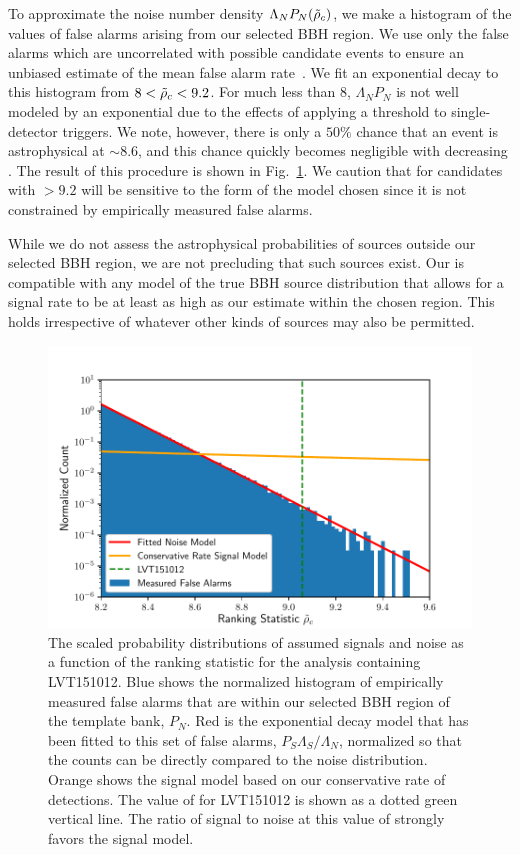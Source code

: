 To approximate the noise number density $\Lambda_N P_N(\tilde{\rho}_c)$, we make a histogram of the \rankingstat{}
values of false alarms arising from our selected BBH region. We use only the false alarms which are uncorrelated
with possible candidate events to ensure an unbiased estimate of the mean false alarm rate~\citep{2017PhRvD..96h2002C}.
We fit an exponential decay to this histogram from $8<\tilde{\rho}_c<9.2$. For \rankingstat{} much less than $8$,
$\Lambda_N P_N$ is not well modeled by an exponential due to the effects of applying a threshold to single-detector
triggers. We note, however, there is only a $ 50 \%$ chance that an event is astrophysical at
\rankingstat{} $\sim 8.6$, and this chance quickly becomes negligible with decreasing \rankingstat. The result of this
procedure is shown in Fig.~\ref{fig:pastro}. We caution that \pastro{} for candidates with
\rankingstat{} $>9.2$ will be sensitive to the form of the model chosen since it is not constrained by
empirically measured false alarms.

While we do not assess the astrophysical probabilities of sources outside our selected BBH region, we are not precluding that such sources exist.
Our \pastro{} is compatible with any model of the true BBH
source distribution that allows for a signal rate to be at least as high as our estimate within the chosen region. This holds irrespective of whatever other kinds of sources may also be permitted.

\begin{figure}[h]
  \centering
    \includegraphics[width=\columnwidth]{figs/chapter5/pastro.pdf}
\caption{The scaled probability distributions of assumed signals and noise as a function of the ranking statistic \rankingstat{} for the analysis containing LVT151012. Blue shows the normalized histogram of empirically measured false alarms that are within our selected BBH region of the template bank, $P_N$. Red is the exponential decay model that has been fitted to this set of false alarms, $P_S \Lambda_S / \Lambda_N$, normalized so that the counts can be directly compared to the noise distribution. Orange shows the signal model based on our conservative rate of detections. The value of \rankingstat{} for LVT151012 is shown as a dotted green vertical line. The ratio of signal to noise at this value of \rankingstat{} strongly favors the signal model.}
\label{fig:pastro}
\end{figure}


